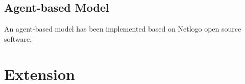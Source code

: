 \documentclass[a4paper, 12pt]{article}
\begin{document}
\subsection{Agent-based Model}
An agent-based model has been implemented based on Netlogo open source software, 
\section{Extension}
\end{document}
